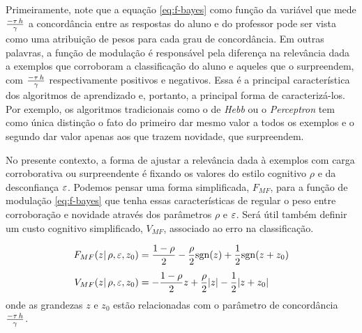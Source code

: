 Primeiramente, note que a equação \eqref{eq:f-bayes} como função da variável que mede $\frac{-\tau\,h}{\gamma}$ a concordância entre as respostas do aluno e do professor pode ser vista como uma atribuição de pesos para cada grau de concordância.
Em outras palavras, a função de modulação é responsável pela diferença na relevância dada a exemplos que corroboram a classificação do aluno e aqueles que o surpreendem, com $\frac{-\tau\,h}{\gamma}$ respectivamente positivos e negativos.
Essa é a principal característica dos algoritmos de aprendizado e, portanto, a principal forma de caracterizá-los.
Por exemplo, os algoritmos tradicionais como o de \emph{Hebb} ou o \emph{Perceptron} tem como única distinção o fato do primeiro dar mesmo valor a todos os exemplos e o segundo dar valor apenas aos que trazem novidade, que surpreendem.

No presente contexto, a forma de ajustar a relevância dada à exemplos com carga corroborativa ou surpreendente é fixando os valores do estilo cognitivo $\rho$ e da desconfiança $\varepsilon$.
Podemos pensar uma forma simplificada, $F_{MF}$, para a função de modulação \eqref{eq:f-bayes} que tenha essas características de regular o peso entre corroboração e novidade através dos parâmetros $\rho$ e $\varepsilon$.
Será útil também definir um custo cognitivo simplificado, $V_{MF}$, associado ao erro na classificação.

\newcommand{\EFmf}{\ensuremath{F_{MF}}}
\newcommand{\EVmf}{\ensuremath{V_{MF}}}
\begin{align}
    \EFmf(z|\,\rho,\ns,z_0) & = \frac{1-\rho}{2}
    - \frac{\rho}{2}\sgn(z)
    + \half\sgn(z+z_0) \label{eq:f-mf} \\[4pt]
    \EVmf(z|\,\rho,\ns,z_0) & = - \frac{1-\rho}{2}z
    + \frac{\rho}{2}|z| -
    \half|z+z_0| \label{eq:v-mf}
\end{align}
onde as grandezas $z$ e $z_0$ estão relacionadas com o parâmetro de concordância $\frac{-\tau\,h}{\gamma}$.

